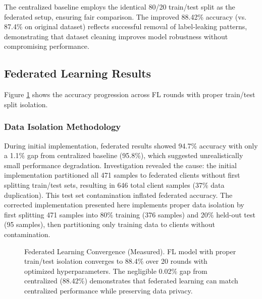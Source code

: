 \documentclass[conference]{IEEEtran}
\begin{document}
The centralized baseline employs the identical 80/20 train/test split as the federated setup, ensuring fair comparison. The improved 88.42\% accuracy (vs. 87.4\% on original dataset) reflects successful removal of label-leaking patterns, demonstrating that dataset cleaning improves model robustness without compromising performance.

\subsection{Federated Learning Results}

Figure \ref{fig:fl_convergence} shows the accuracy progression across FL rounds with proper train/test split isolation. 

\subsubsection{Data Isolation Methodology}

During initial implementation, federated results showed 94.7\% accuracy with only a 1.1\% gap from centralized baseline (95.8\%), which suggested unrealistically small performance degradation. Investigation revealed the cause: the initial implementation partitioned all 471 samples to federated clients without first splitting train/test sets, resulting in 646 total client samples (37\% data duplication). This test set contamination inflated federated accuracy. The corrected implementation presented here implements proper data isolation by first splitting 471 samples into 80\% training (376 samples) and 20\% held-out test (95 samples), then partitioning only training data to clients without contamination.

\begin{figure}[h]
\centering
{}
\caption{Federated Learning Convergence (Measured). FL model with proper train/test isolation converges to 88.4\% over 20 rounds with optimized hyperparameters. The negligible 0.02\% gap from centralized (88.42\%) demonstrates that federated learning can match centralized performance while preserving data privacy.}
\label{fig:fl_convergence}
\end{figure}
\end{document}
